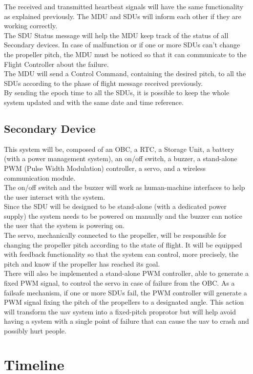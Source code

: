 The received and transmitted heartbeat signals will have the same functionality as explained previously. The MDU and SDUs will inform each other if they are working correctly.\\

The SDU Status message will help the MDU keep track of the status of all Secondary devices. In case of malfunction or if one or more SDUs can't change the propeller pitch, the MDU must be noticed so that it can communicate to the Flight Controller about the failure.\\

The MDU will send a Control Command, containing the desired pitch, to all the SDUs according to the phase of flight message received previously.\\

By sending the epoch time to all the SDUs, it is possible to keep the whole system updated and with the same date and time reference.\\

\subsection{Secondary Device}
This system will be, composed of an \gls{OBC}, a \gls{RTC}, a Storage Unit, a battery (with a power management system), an on/off switch, a buzzer, a stand-alone \gls{PWM} (Pulse Width Modulation) controller, a servo, and a wireless communication module.\\

The on/off switch and the buzzer will work as human-machine interfaces to help the user interact with the system.\\
Since the SDU will be designed to be stand-alone (with a dedicated power supply) the system needs to be powered on manually and the buzzer can notice the user that the system is powering on.\\

The servo, mechanically connected to the propeller, will be responsible for changing the propeller pitch according to the state of flight.
It will be equipped with feedback functionality so that the system can control, more precisely, the pitch and know if the propeller has reached its goal.\\

There will also be implemented a stand-alone \gls{PWM} controller, able to generate a fixed \gls{PWM} signal, to control the servo in case of failure from the \gls{OBC}.
As a failsafe mechanism, if one or more SDUs fail, the \gls{PWM} controller will generate a \gls{PWM} signal fixing the pitch of the propellers to a designated angle.
This action will transform the \gls{uav} system into a fixed-pitch proprotor but will help avoid having a system with a single point of failure that can cause the \gls{uav} to crash and possibly hurt people.\\

\section{Timeline}
